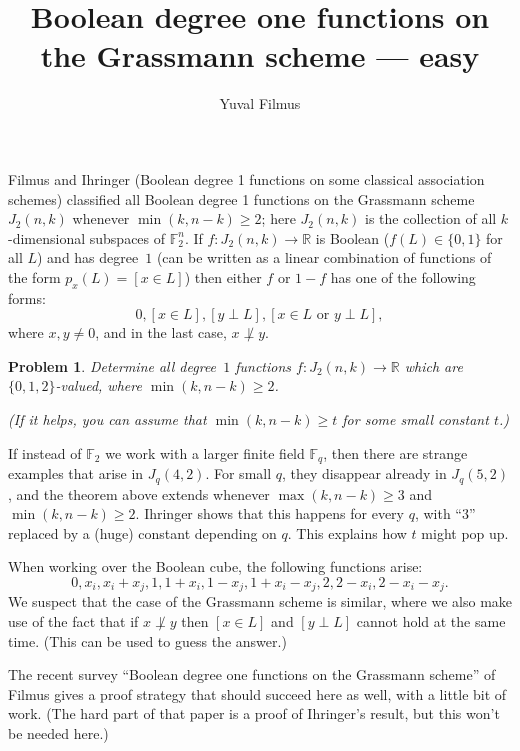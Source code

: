 \documentclass[10pt]{article}
\title{Boolean degree one functions on the Grassmann scheme --- easy}
\author{Yuval Filmus}
\date{}
\newtheorem{problem}{Problem}
\begin{document}
\maketitle

Filmus and Ihringer (Boolean degree 1 functions on some classical association schemes) classified all Boolean degree 1 functions on the Grassmann scheme $J_2(n,k)$ whenever $\min(k,n-k) \ge 2$; here $J_2(n,k)$ is the collection of all $k$-dimensional subspaces of $\mathbb{F}_2^n$. If $f\colon J_2(n,k) \to \mathbb{R}$ is Boolean ($f(L) \in \{0,1\}$ for all $L$) and has degree~$1$ (can be written as a linear combination of functions of the form $p_x(L) = [x \in L]$) then either $f$ or $1-f$ has one of the following forms:
\[
 0, [x \in L], [y \perp L], [x \in L \text{ or } y \perp L],
\]
where $x,y \ne 0$, and in the last case, $x \not\perp y$.

\begin{problem}
Determine all degree~$1$ functions $f\colon J_2(n,k) \to \mathbb{R}$ which are $\{0,1,2\}$-valued, where $\min(k,n-k) \ge 2$.

(If it helps, you can assume that $\min(k,n-k) \ge t$ for some small constant $t$.)
\end{problem}

If instead of $\mathbb{F}_2$ we work with a larger finite field $\mathbb{F}_q$, then there are strange examples that arise in $J_q(4,2)$. For small $q$, they disappear already in $J_q(5,2)$, and the theorem above extends whenever $\max(k,n-k) \ge 3$ and $\min(k,n-k) \ge 2$. Ihringer shows that this happens for every $q$, with ``$3$'' replaced by a (huge) constant depending on $q$. This explains how $t$ might pop up.

When working over the Boolean cube, the following functions arise:
\[
 0, x_i, x_i + x_j, 1, 1 + x_i, 1 - x_j, 1 + x_i - x_j, 2, 2 - x_i, 2 - x_i - x_j.
\]
We suspect that the case of the Grassmann scheme is similar, where we also make use of the fact that if $x \not\perp y$ then $[x \in L]$ and $[y \perp L]$ cannot hold at the same time. (This can be used to guess the answer.)

The recent survey ``Boolean degree one functions on the Grassmann scheme'' of Filmus gives a proof strategy that should succeed here as well, with a little bit of work. (The hard part of that paper is a proof of Ihringer's result, but this won't be needed here.)
\end{document}
